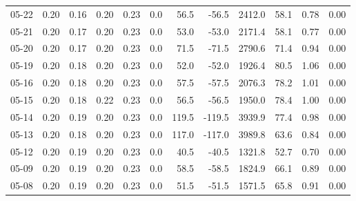 \begin{threeparttable}
{\begin{tabular}{lrrrrrrrrrrr}
  05-22 &          0.20 &          0.16 &          0.20 &        0.23 &                 0.0 &                56.5 &      -56.5 &              2412.0 &             58.1 &            0.78 &                   0.00 \\
  05-21 &          0.20 &          0.17 &          0.20 &        0.23 &                 0.0 &                53.0 &      -53.0 &              2171.4 &             58.1 &            0.77 &                   0.00 \\
  05-20 &          0.20 &          0.17 &          0.20 &        0.23 &                 0.0 &                71.5 &      -71.5 &              2790.6 &             71.4 &            0.94 &                   0.00 \\
  05-19 &          0.20 &          0.18 &          0.20 &        0.23 &                 0.0 &                52.0 &      -52.0 &              1926.4 &             80.5 &            1.06 &                   0.00 \\
  05-16 &          0.20 &          0.18 &          0.20 &        0.23 &                 0.0 &                57.5 &      -57.5 &              2076.3 &             78.2 &            1.01 &                   0.00 \\
  05-15 &          0.20 &          0.18 &          0.22 &        0.23 &                 0.0 &                56.5 &      -56.5 &              1950.0 &             78.4 &            1.00 &                   0.00 \\
  05-14 &          0.20 &          0.19 &          0.20 &        0.23 &                 0.0 &               119.5 &     -119.5 &              3939.9 &             77.4 &            0.98 &                   0.00 \\
  05-13 &          0.20 &          0.18 &          0.20 &        0.23 &                 0.0 &               117.0 &     -117.0 &              3989.8 &             63.6 &            0.84 &                   0.00 \\
  05-12 &          0.20 &          0.19 &          0.20 &        0.23 &                 0.0 &                40.5 &      -40.5 &              1321.8 &             52.7 &            0.70 &                   0.00 \\
  05-09 &          0.20 &          0.19 &          0.20 &        0.23 &                 0.0 &                58.5 &      -58.5 &              1824.9 &             66.1 &            0.89 &                   0.00 \\
  05-08 &          0.20 &          0.19 &          0.20 &        0.23 &                 0.0 &                51.5 &      -51.5 &              1571.5 &             65.8 &            0.91 &                   0.00 \\

\end{tabular}}
\end{threeparttable}
